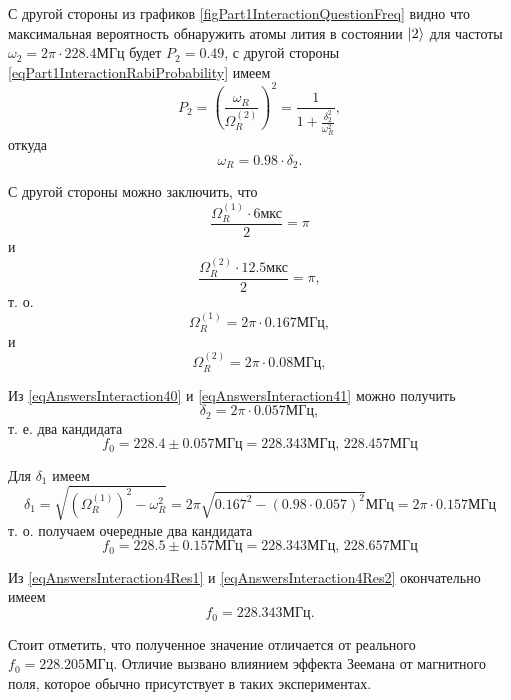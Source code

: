 С другой стороны из графиков
\autoref{figPart1InteractionQuestionFreq} видно что максимальная
вероятность обнаружить атомы лития в состоянии $\ket{2}$ для
частоты $\omega_2 = 2 \pi \cdot 228.4 \mbox{МГц}$ будет $P_2 = 0.49$,
с другой стороны \eqref{eqPart1InteractionRabiProbability} имеем
\begin{equation}
  P_2 = \left(\frac{\omega_R}{\Omega_R^{(2)}}\right)^2 =
  \frac{1}{1 + \frac{\delta_2^2}{\omega_R^2}},
  \nonumber
\end{equation}
откуда
\begin{equation}
  \omega_R = 0.98 \cdot \delta_2 .
  \label{eqAnswersInteraction41}
\end{equation}

С другой стороны можно заключить, что
\[
\frac{\Omega_R^{(1)} \cdot 6 \mbox{мкс}}{2} = \pi
\]
и
\[
\frac{\Omega_R^{(2)} \cdot 12.5 \mbox{мкс}}{2} = \pi,
\]
т. о.
\[
\Omega_R^{(1)} = 2 \pi \cdot 0.167 \mbox{МГц},
\]
и
\[
\Omega_R^{(2)} = 2 \pi \cdot 0.08 \mbox{МГц},
\]

Из \eqref{eqAnswersInteraction40} и  \eqref{eqAnswersInteraction41}
можно получить
\[
\delta_2 = 2 \pi \cdot 0.057 \mbox{МГц},
\]
т. е. два кандидата
\begin{equation}
  f_0 = 228.4 \pm 0.057 \mbox{МГц} = 228.343 \mbox{МГц},\,
  228.457 \mbox{МГц} 
\label{eqAnswersInteraction4Res1}
\end{equation}

Для $\delta_1$ имеем
\[
\delta_1 = \sqrt{\left(\Omega_R^{(1)}\right)^2 - \omega_R^2} =
2 \pi \sqrt{0.167^2 - (0.98 \cdot 0.057)^2} \mbox{МГц} =
2 \pi \cdot 0.157 \mbox{МГц}
\]
т. о. получаем очередные два кандидата
\begin{equation}
  f_0 = 228.5 \pm 0.157 \mbox{МГц} = 228.343 \mbox{МГц},\,
  228.657 \mbox{МГц} 
\label{eqAnswersInteraction4Res2}
\end{equation}

Из \eqref{eqAnswersInteraction4Res1} и
\eqref{eqAnswersInteraction4Res2} окончательно имеем
\[
f_0 = 228.343 \mbox{МГц}.
\]

Стоит отметить, что полученное значение отличается от реального $f_0 =
228.205 \mbox{МГц}$. Отличие вызвано влиянием эффекта Зеемана от
магнитного поля, которое обычно присутствует в таких экспериментах.



